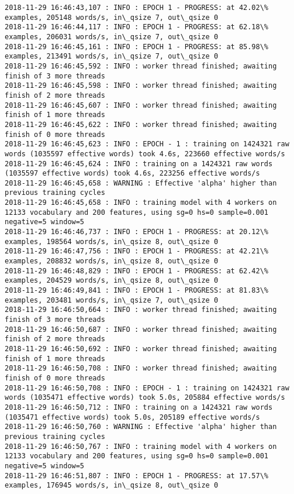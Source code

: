 \documentclass[11pt]{article}
\begin{document}
\begin{Verbatim}[commandchars=\\\{\}]
2018-11-29 16:46:43,107 : INFO : EPOCH 1 - PROGRESS: at 42.02\% examples, 205148 words/s, in\_qsize 7, out\_qsize 0
2018-11-29 16:46:44,117 : INFO : EPOCH 1 - PROGRESS: at 62.18\% examples, 206031 words/s, in\_qsize 7, out\_qsize 0
2018-11-29 16:46:45,161 : INFO : EPOCH 1 - PROGRESS: at 85.98\% examples, 213491 words/s, in\_qsize 7, out\_qsize 0
2018-11-29 16:46:45,592 : INFO : worker thread finished; awaiting finish of 3 more threads
2018-11-29 16:46:45,598 : INFO : worker thread finished; awaiting finish of 2 more threads
2018-11-29 16:46:45,607 : INFO : worker thread finished; awaiting finish of 1 more threads
2018-11-29 16:46:45,622 : INFO : worker thread finished; awaiting finish of 0 more threads
2018-11-29 16:46:45,623 : INFO : EPOCH - 1 : training on 1424321 raw words (1035597 effective words) took 4.6s, 223660 effective words/s
2018-11-29 16:46:45,624 : INFO : training on a 1424321 raw words (1035597 effective words) took 4.6s, 223256 effective words/s
2018-11-29 16:46:45,658 : WARNING : Effective 'alpha' higher than previous training cycles
2018-11-29 16:46:45,658 : INFO : training model with 4 workers on 12133 vocabulary and 200 features, using sg=0 hs=0 sample=0.001 negative=5 window=5
2018-11-29 16:46:46,737 : INFO : EPOCH 1 - PROGRESS: at 20.12\% examples, 198564 words/s, in\_qsize 8, out\_qsize 0
2018-11-29 16:46:47,756 : INFO : EPOCH 1 - PROGRESS: at 42.21\% examples, 208832 words/s, in\_qsize 8, out\_qsize 0
2018-11-29 16:46:48,829 : INFO : EPOCH 1 - PROGRESS: at 62.42\% examples, 204529 words/s, in\_qsize 8, out\_qsize 0
2018-11-29 16:46:49,841 : INFO : EPOCH 1 - PROGRESS: at 81.83\% examples, 203481 words/s, in\_qsize 7, out\_qsize 0
2018-11-29 16:46:50,664 : INFO : worker thread finished; awaiting finish of 3 more threads
2018-11-29 16:46:50,687 : INFO : worker thread finished; awaiting finish of 2 more threads
2018-11-29 16:46:50,692 : INFO : worker thread finished; awaiting finish of 1 more threads
2018-11-29 16:46:50,708 : INFO : worker thread finished; awaiting finish of 0 more threads
2018-11-29 16:46:50,708 : INFO : EPOCH - 1 : training on 1424321 raw words (1035471 effective words) took 5.0s, 205884 effective words/s
2018-11-29 16:46:50,712 : INFO : training on a 1424321 raw words (1035471 effective words) took 5.0s, 205189 effective words/s
2018-11-29 16:46:50,760 : WARNING : Effective 'alpha' higher than previous training cycles
2018-11-29 16:46:50,767 : INFO : training model with 4 workers on 12133 vocabulary and 200 features, using sg=0 hs=0 sample=0.001 negative=5 window=5
2018-11-29 16:46:51,807 : INFO : EPOCH 1 - PROGRESS: at 17.57\% examples, 176945 words/s, in\_qsize 8, out\_qsize 0

\end{Verbatim}
\end{document}
